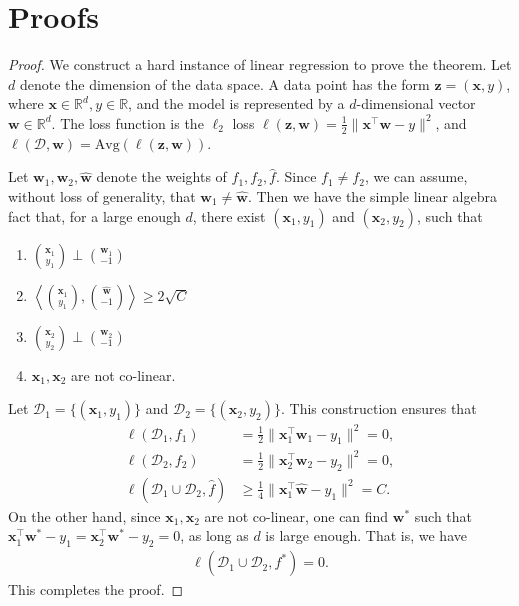 \section{Proofs}
\label{apx: proof}

\thma*

\begin{proof}
We construct a hard instance of linear regression to prove the theorem. Let $d$ denote the dimension of the data space. A data point has the form $\boldsymbol{z} = (\boldsymbol{x}, y)$, where $\boldsymbol{x}\in\mathbb{R}^d, y\in\mathbb{R}$, and the model is represented by a $d$-dimensional vector $\boldsymbol{w}\in\mathbb{R}^d$. The loss function is the $\ell_2$ loss $\ell(\boldsymbol{z}, \boldsymbol{w}) = \frac{1}{2}\|\boldsymbol{x}^\top \boldsymbol{w}-y\|^2$, and $\ell(\mathcal{D}, \boldsymbol{w}) = \text{Avg}(\ell(\boldsymbol{z}, \boldsymbol{w}))$.

Let $\boldsymbol{w}_1, \boldsymbol{w}_2, \hat{\boldsymbol{w}}$ denote the weights of $f_1, f_2, \hat{f}$. Since $f_1\neq f_2$, we can assume, without loss of generality, that $\boldsymbol{w}_1\neq \hat{\boldsymbol{w}}$. Then we have the simple linear algebra fact that, for a large enough $d$,  there exist $(\boldsymbol{x}_1, y_1)$ and $(\boldsymbol{x}_2, y_2)$, such that 


\begin{enumerate}
    \setlength{\itemsep}{0pt} %
    \item $\binom{\boldsymbol{x}_1}{y_1} \perp \binom{\boldsymbol{w}_1}{-1}$
    \item $\left\langle \binom{\boldsymbol{x}_1}{y_1}, \binom{\hat{\boldsymbol{w}}}{-1} \right\rangle \ge 2\sqrt{C}$
    \item $\binom{\boldsymbol{x}_2}{y_2} \perp \binom{\boldsymbol{w}_2}{-1}$
    \item $\boldsymbol{x}_1, \boldsymbol{x}_2$ are not co-linear.
\end{enumerate}

Let $\mathcal{D}_1 = \{(\boldsymbol{x}_1, y_1)\}$ and $\mathcal{D}_2 = \{(\boldsymbol{x}_2, y_2)\}$. This construction ensures that 
\begin{align*}
    \ell(\mathcal{D}_1, f_1) &= \frac{1}{2}\|\boldsymbol{x}_1^\top \boldsymbol{w}_1 - y_1\|^2 = 0, \\
    \ell(\mathcal{D}_2, f_2) &= \frac{1}{2}\|\boldsymbol{x}_2^\top \boldsymbol{w}_2 - y_2\|^2 = 0, \\
    \ell(\mathcal{D}_1 \cup \mathcal{D}_2, \hat{f}) &\ge 
    \frac{1}{4}\|\boldsymbol{x}_1^\top \hat{\boldsymbol{w}} - y_1\|^2 = C. 
\end{align*}
On the other hand, since $\boldsymbol{x}_1, \boldsymbol{x}_2$ are not co-linear, one can find $\boldsymbol{w}^*$ such that $\boldsymbol{x}_1^\top \boldsymbol{w}^* - y_1 = \boldsymbol{x}_2^\top \boldsymbol{w}^* - y_2 = 0$, as long as $d$ is large enough. That is, we have 
\begin{align*}
    \ell(\mathcal{D}_1 \cup \mathcal{D}_2, f^*) = 0.
\end{align*}
This completes the proof. 

\end{proof}

